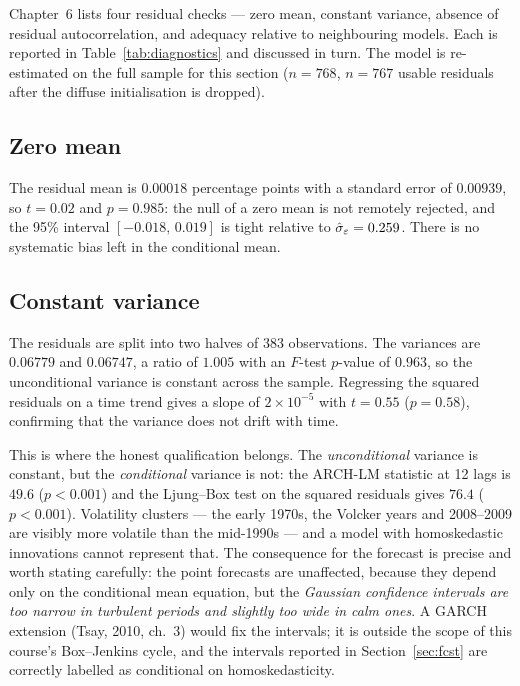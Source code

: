 Chapter~6 lists four residual checks --- zero mean, constant variance, absence of
residual autocorrelation, and adequacy relative to neighbouring models. Each is
reported in Table~\ref{tab:diagnostics} and discussed in turn. The model is
re-estimated on the full sample for this section ($n=768$, $n=767$ usable
residuals after the diffuse initialisation is dropped).



\subsection{Zero mean}

The residual mean is $0.00018$ percentage points with a standard error of
$0.00939$, so $t=0.02$ and $p=0.985$: the null of a zero mean is not remotely
rejected, and the 95\% interval $[-0.018,\,0.019]$ is tight relative to
$\hat\sigma_\varepsilon=0.259$. There is no systematic bias left in the conditional mean.

\subsection{Constant variance}

The residuals are split into two halves of 383 observations. The variances are
$0.06779$ and $0.06747$, a ratio of $1.005$ with an $F$-test $p$-value of $0.963$,
so the unconditional variance is constant across the sample. Regressing the squared
residuals on a time trend gives a slope of $2\times10^{-5}$ with $t=0.55$
($p=0.58$), confirming that the variance does not drift with time.

This is where the honest qualification belongs. The \emph{unconditional} variance
is constant, but the \emph{conditional} variance is not: the ARCH-LM statistic at
12 lags is $49.6$ ($p<0.001$) and the Ljung--Box test on the squared residuals
gives $76.4$ ($p<0.001$). Volatility clusters --- the early 1970s, the Volcker
years and 2008--2009 are visibly more volatile than the mid-1990s --- and a model
with homoskedastic innovations cannot represent that. The consequence for the
forecast is precise and worth stating carefully: the point forecasts are
unaffected, because they depend only on the conditional mean equation, but the
\emph{Gaussian confidence intervals are too narrow in turbulent periods and
slightly too wide in calm ones}. A GARCH extension (Tsay, 2010, ch.~3) would fix
the intervals; it is outside the scope of this course's Box--Jenkins cycle, and
the intervals reported in Section~\ref{sec:fcst} are correctly labelled as
conditional on homoskedasticity.

